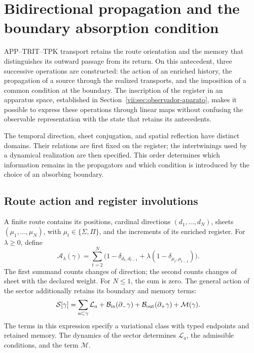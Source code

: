 
\section{Bidirectional propagation and the boundary absorption condition}
\label{vii:sec:propagacion-bidireccional}

APP--TRIT--TPK transport retains the route orientation and the memory
that distinguishes its outward passage from its return. On this antecedent, three
successive operations are constructed: the action of an enriched history, the propagation
of a source through the realized transports, and the imposition of a
common condition at the boundary. The inscription of the register in an apparatus
space, established in Section~\ref{vii:sec:observador-aparato}, makes it possible
to express these operations through linear maps without confusing the
observable representation with the state that retains its antecedents.

The temporal direction, sheet conjugation, and spatial reflection
have distinct domains. Their relations are first fixed on the register;
the intertwinings used by a dynamical realization are then
specified. This order determines which information remains in the propagators
and which condition is introduced by the choice of an absorbing boundary.

\subsection{Route action and register involutions}
\label{vii:subsec:accion-bidireccional}

A finite route contains its positions, cardinal directions
\((d_1,\ldots,d_N)\), sheets \((\mu_1,\ldots,\mu_N)\), with
\(\mu_t\in\{\Sigma,\Pi\}\), and the increments of its enriched
register. For \(\lambda\geq0\), define
\begin{equation}
 \mathcal A_\lambda(\gamma)
 =\sum_{t=2}^N
 \bigl(1-\delta_{d_t,d_{t-1}}
       +\lambda(1-\delta_{\mu_t,\mu_{t-1}})\bigr).
 \label{vii:eq:accion-ruta-bidireccional}
\end{equation}
The first summand counts changes of direction; the second counts changes
of sheet with the declared weight. For \(N\leq1\), the sum is zero.
The general action of the sector additionally retains its boundary and
memory terms:
\begin{equation}
 \mathcal S[\gamma]
 =\sum_{a\subset\gamma}\mathcal L_a
  +\mathcal B_{\rm in}(\partial_-\gamma)
  +\mathcal B_{\rm out}(\partial_+\gamma)
  +\mathcal M(\gamma).
 \label{vii:eq:accion-enriquecida-frontera}
\end{equation}
The terms in this expression specify a variational class with
typed endpoints and retained memory. The dynamics of the sector determines
\(\mathcal L_a\), the admissible conditions, and the term \(\mathcal M\).

